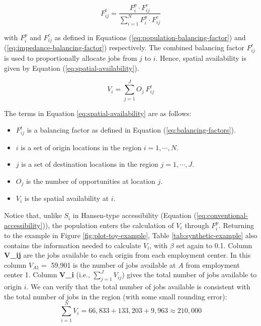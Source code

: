\documentclass[10pt,letterpaper]{article}
\providecommand{\tightlist}{%
  \setlength{\itemsep}{0pt}\setlength{\parskip}{0pt}}
\begin{document}
\begin{equation}
\label{eq:balancing-factors}
F^t_{ij} = \frac{F^p_{i} \cdot F^c_{ij}}{\sum_{i=1}^N F^p_{i} \cdot F^c_{ij}}
\end{equation}

\noindent with \(F^p_{i}\) and \(F^c_{ij}\) as defined in Equations
(\ref{eq:population-balancing-factor}) and
(\ref{eq:impedance-balancing-factor}) respectively. The combined
balancing factor \(F^t_{ij}\) is used to proportionally allocate jobs
from \(j\) to \(i\). Hence, spatial availability is given by Equation
(\ref{eq:spatial-availability}).

\begin{equation}
\label{eq:spatial-availability}
V_{i} = \sum_{j=1}^J O_j\ F^t_{ij}
\end{equation}

The terms in Equation \ref{eq:spatial-availability} are as follows:

\begin{itemize}
\tightlist
\item
  \(F^t_{ij}\) is a balancing factor as defined in Equation
  (\ref{eq:balancing-factors}).
\item
  \(i\) is a set of origin locations in the region \(i = 1,\cdots, N\).
\item
  \(j\) is a set of destination locations in the region
  \(j = 1,\cdots,J\).
\item
  \(O_j\) is the number of opportunities at location \(j\).
\item
  \(V_{i}\) is the spatial availability at \(i\).
\end{itemize}

Notice that, unlike \(S_i\) in Hansen-type accessibility (Equation
(\ref{eq:conventional-accessibility})), the population enters the
calculation of \(V_{i}\) through \(F^p_i\). Returning to the example in
Figure \ref{fig:plot-toy-example}, Table \ref{tab:synthetic-example}
also contains the information needed to calculate \(V_i\), with
\(\beta\) set again to 0.1. Column \textbf{V\_ij} are the jobs available
to each origin from each employment center. In this column \(V_{A1}=\)
59,901 is the number of jobs available at \(A\) from employment center
1. Column \textbf{V\_i} (i.e., \(\sum_{j=1}^JV_{ij}\)) gives the total
number of jobs available to origin \(i\). We can verify that the total
number of jobs available is consistent with the total number of jobs in
the region (with some small rounding error): \[
\sum_{i=1}^N V_i = 66,833 + 133,203 + 9,963 \approx 210,000 
\]
\end{document}
